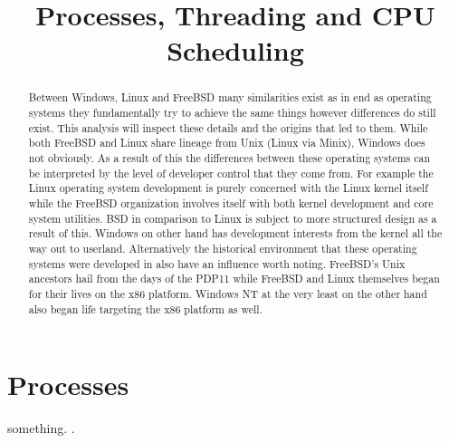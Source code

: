 \documentclass[letterpaper,10pt,draftclsnofoot,onecolumn]{IEEEtran}
\begin{document}
\title{Processes, Threading and CPU Scheduling}

\author{
}

\maketitle
\begin{abstract}
Between Windows, Linux and FreeBSD many similarities exist as in end as operating systems they fundamentally try to achieve the same things however differences do still exist. This analysis will inspect these details and the origins that led to them. While both FreeBSD and Linux share lineage from Unix (Linux via Minix), Windows does not obviously. As a result of this the differences between these operating systems can be interpreted by the level of developer control that they come from. For example the Linux operating system development is purely concerned with the Linux kernel itself while the FreeBSD organization involves itself with both kernel development and core system utilities. BSD in comparison to Linux is subject to more structured design as a result of this. Windows on other hand has development interests from the kernel all the way out to userland. Alternatively the historical environment that these operating systems were developed in also have an influence worth noting. FreeBSD’s Unix ancestors hail from the days of the PDP11 while FreeBSD and Linux themselves began for their lives on the x86 platform.  Windows NT at the very least on the other hand also began life targeting the x86 platform as well.
\end{abstract}
\pagebreak

\tableofcontents
\pagebreak
\section{Processes}
something. \cite{love}.
\par

\newpage


\end{document}
